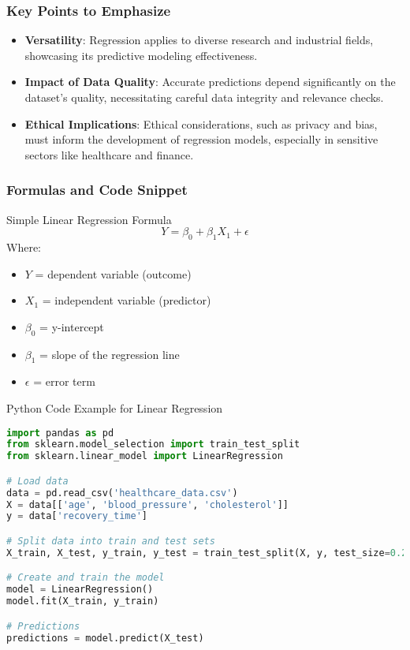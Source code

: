 \documentclass[aspectratio=169]{beamer}
\begin{document}
\begin{frame}[fragile]
  \frametitle{Key Points to Emphasize}
  \begin{itemize}
    \item \textbf{Versatility}: Regression applies to diverse research and industrial fields, showcasing its predictive modeling effectiveness.
    \item \textbf{Impact of Data Quality}: Accurate predictions depend significantly on the dataset's quality, necessitating careful data integrity and relevance checks.
    \item \textbf{Ethical Implications}: Ethical considerations, such as privacy and bias, must inform the development of regression models, especially in sensitive sectors like healthcare and finance.
  \end{itemize}
\end{frame}

\begin{frame}[fragile]
  \frametitle{Formulas and Code Snippet}
  \begin{block}{Simple Linear Regression Formula}
    \begin{equation}
      Y = \beta_0 + \beta_1 X_1 + \epsilon
    \end{equation}
    Where:
    \begin{itemize}
      \item \(Y\) = dependent variable (outcome)
      \item \(X_1\) = independent variable (predictor)
      \item \(\beta_0\) = y-intercept
      \item \(\beta_1\) = slope of the regression line
      \item \(\epsilon\) = error term
    \end{itemize}
  \end{block}

  \begin{block}{Python Code Example for Linear Regression}
    \begin{lstlisting}[language=Python]
import pandas as pd
from sklearn.model_selection import train_test_split
from sklearn.linear_model import LinearRegression

# Load data
data = pd.read_csv('healthcare_data.csv')
X = data[['age', 'blood_pressure', 'cholesterol']]
y = data['recovery_time']

# Split data into train and test sets
X_train, X_test, y_train, y_test = train_test_split(X, y, test_size=0.2)

# Create and train the model
model = LinearRegression()
model.fit(X_train, y_train)

# Predictions
predictions = model.predict(X_test)
    \end{lstlisting}
  \end{block}
\end{frame}
\end{document}

